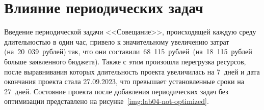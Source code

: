 \section{Влияние периодических задач}

Введение периодической задачи <<Совещание>>, происходящей каждую среду
длительностью в один час, привело к значительному увеличению затрат
(на~20~039~рублей) так, что они составили~68~115~рублей~(на~18~115~рублей больше
заявленного бюджета). Также с этим произошла перегрузка ресурсов, после
выравнивания которых длительность проекта увеличилась на 7~дней и дата окончания
проекта стала 27.09.2023, что превышает установленные сроки на 27~дней.
Состояние проекта после добавления периодических задач без оптимизации
представлено на рисунке~\ref{img:lab04-not-optimized}.


%

%
%
%
%
%
